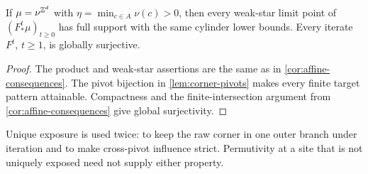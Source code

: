 \begin{corollary}\label{cor:corner-consequences}
If $\mu=\nu^{\mathbb{Z}^d}$ with
$\eta=\min_{c\in A}\nu(c)>0$, then every weak-star limit point of
$(F^t_*\mu)_{t\geq0}$ has full support with the same cylinder lower bounds.
Every iterate $F^t$, $t\geq1$, is globally surjective.
\end{corollary}

\begin{proof}
The product and weak-star assertions are the same as in
\cref{cor:affine-consequences}.  The pivot bijection in
\cref{lem:corner-pivots} makes every finite target pattern attainable.
Compactness and the finite-intersection argument from
\cref{cor:affine-consequences} give global surjectivity.
\end{proof}

\begin{remark}\label{rem:corner-scope}
Unique exposure is used twice: to keep the raw corner in one outer branch
under iteration and to make cross-pivot influence strict.  Permutivity at a
site that is not uniquely exposed need not supply either property.
\end{remark}

